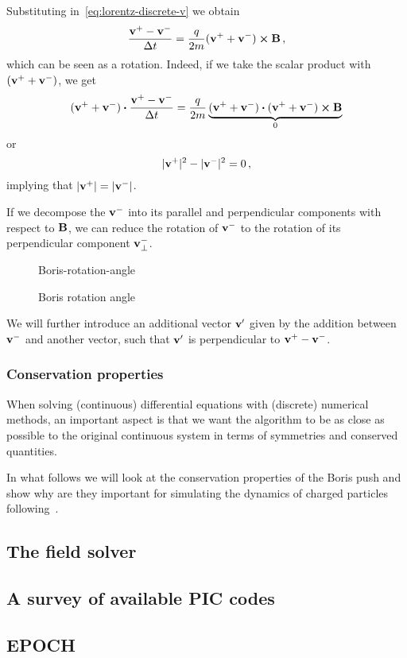 \documentclass[class=report, crop=false]{standalone}
\begin{document}
Substituting in~\eqref{eq:lorentz-discrete-v} we obtain
\[
\frac{\vb{v}^+ - \vb{v}^-}{\Delta t} = \frac{q}{2m} (\vb{v}^+ + \vb{v}^-) \cp \vb{B}\,,
\]
which can be seen as a rotation. Indeed, if we take the scalar product with
\((\vb{v}^+ + \vb{v}^-)\), we get
\[
(\vb{v}^+ + \vb{v}^-) \vdot \frac{\vb{v}^+ - \vb{v}^-}{\Delta t} =
\frac{q}{2m} \underbrace{(\vb{v}^+ + \vb{v}^-) \vdot (\vb{v}^+ + \vb{v}^-) \cp \vb{B}}_{0}
\]
or
\[
|\vb{v}^+|^2 - |\vb{v}^-|^2 = 0\,,
\]
implying that \(|\vb{v}^+| = |\vb{v}^-|\).

If we decompose the \(\vb{v}^-\) into its parallel and perpendicular components
with respect to \(\vb{B}\), we can reduce the rotation of \(\vb{v}^-\) to
the rotation of its perpendicular component \(\vb{v}^-_\perp\).

\begin{figure}[h]
  \caption{Boris rotation angle}\label{fig:Boris-rotation-angle}%
  {Boris-rotation-angle}%
\end{figure}


We will further introduce an additional vector \(\vb{v}'\) given by the addition
between \(\vb{v}^-\) and another vector, such that \(\vb{v}'\) is perpendicular
to \(\vb{v}^+ - \vb{v}^-\).

\subsubsection{Conservation properties}

When solving (continuous) differential equations with (discrete) numerical methods,
an important aspect is that we want the algorithm to be as close as possible to
the original continuous system in terms of symmetries and conserved quantities.

In what follows we will look at the conservation properties of the Boris push
and show why are they important for simulating the dynamics of charged particles
following~\textcite{qin_whyboris_2013}.

\subsection{The field solver}

\subsection{A survey of available PIC codes}

\subsection{EPOCH}
\end{document}
